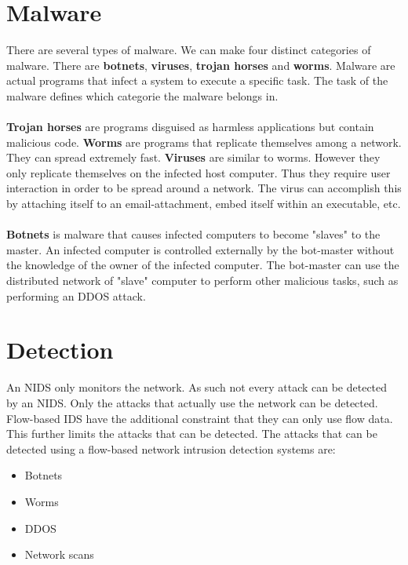 \section{Malware}
There are several types of malware. We can make four distinct categories of malware. There are \textbf{botnets}, \textbf{viruses}, \textbf{trojan horses} and \textbf{worms}. Malware are actual programs that infect a system to execute a specific task. The task of the malware defines which categorie the malware belongs in.\\
\\
\textbf{Trojan horses} are programs disguised as harmless applications but contain malicious code. \textbf{Worms} are programs that replicate themselves among a network.  They can spread extremely fast. \textbf{Viruses} are similar to worms. However they only replicate themselves on the infected host computer. Thus they require user interaction in order to be spread around a network. The virus can accomplish this by attaching itself to an email-attachment, embed itself within an executable, etc. \\
\\
\textbf{Botnets} is malware that causes infected computers to become "slaves" to the master. An infected computer is controlled externally by the bot-master without the knowledge of the owner of the infected computer. The bot-master can use the distributed network of "slave" computer to perform other malicious tasks, such as performing an DDOS attack.

\section{Detection}
An NIDS only monitors the network. As such not every attack can be detected by an NIDS. Only the attacks that actually use the network can be detected. Flow-based IDS have the additional constraint that they can only use flow data. This further limits the attacks that can be detected. The attacks that can be detected using a flow-based network intrusion detection systems are:
\begin{itemize}
\item Botnets
\item Worms
\item DDOS
\item Network scans
\end{itemize}

